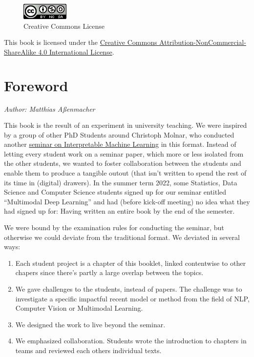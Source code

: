\documentclass[
]{krantz}
\providecommand{\tightlist}{%
  \setlength{\itemsep}{0pt}\setlength{\parskip}{0pt}}
\begin{document}
\begin{figure}
\centering
\includegraphics{figures/by-nc-sa.png}
\caption{Creative Commons License}
\end{figure}

This book is licensed under the \href{http://creativecommons.org/licenses/by-nc-sa/4.0/}{Creative Commons Attribution-NonCommercial-ShareAlike 4.0 International License}.

\mainmatter

\hypertarget{foreword}{%
\chapter*{Foreword}\label{foreword}}


\emph{Author: Matthias Aßenmacher}

This book is the result of an experiment in university teaching. We were inspired by a group of other PhD Students around Christoph Molnar, who conducted another \href{https://compstat-lmu.github.io/iml_methods_limitations/}{seminar on Interpretable Machine Learning} in this format.
Instead of letting every student work on a seminar paper, which more or less isolated from the other students, we wanted to foster collaboration between the students and enable them to produce a tangible outout (that isn't written to spend the rest of its time in (digital) drawers).
In the summer term 2022, some Statistics, Data Science and Computer Science students signed up for our seminar entitled ``Multimodal Deep Learning'' and had (before kick-off meeting) no idea what they had signed up for: Having written an entire book by the end of the semester.

We were bound by the examination rules for conducting the seminar, but otherwise we could deviate from the traditional format.
We deviated in several ways:

\begin{enumerate}
\def\labelenumi{\arabic{enumi}.}
\tightlist
\item
  Each student project is a chapter of this booklet, linked contentwise to other chapers since there's partly a large overlap between the topics.
\item
  We gave challenges to the students, instead of papers. The challenge was to investigate a specific impactful recent model or method from the field of NLP, Computer Vision or Multimodal Learning.
\item
  We designed the work to live beyond the seminar.
\item
  We emphasized collaboration. Students wrote the introduction to chapters in teams and reviewed each others individual texts.
\end{enumerate}
\end{document}
